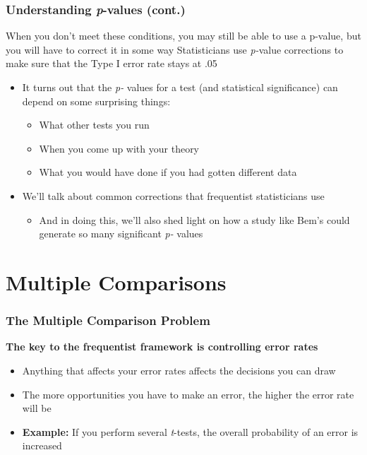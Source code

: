 \documentclass[10pt, block=fill]{beamer}
\begin{document}
\begin{frame}
  \frametitle{Understanding \textit{p}-values (cont.)}
  
  \begin{block}{When you don't meet these conditions, you may still be able to use a p-value, but you will have to correct it in some way}
    Statisticians use \textit{p-}value corrections to make sure that the Type I error rate stays at .05
  \end{block}
  
  \begin{itemize}
    \item  It turns out that the \textit{p-} values for a test (and statistical significance) can depend on some surprising things:
    \begin{itemize}
      \item What other tests you run
      \item When you come up with your theory
      \item What you would have done if you had gotten different data
    \end{itemize}
    \item We'll talk about common corrections that frequentist statisticians use
    \begin{itemize}
      \item And in doing this, we'll also shed light on how a study like Bem's could generate so many significant \textit{p-} values
    \end{itemize}
  \end{itemize}
\end{frame}



\section{Multiple Comparisons}

\begin{frame}
  \frametitle{The Multiple Comparison Problem}

  \textbf{The key to the frequentist framework is controlling error rates}
  
  \vspace{0.25in}
  
  \begin{itemize}
    \item Anything that affects your error rates affects the decisions you can draw
    \item The more opportunities you have to make an error, the higher the error rate will be 
    \item \textbf{Example:} If you perform several \textit{t}-tests, the overall probability of an error is increased
  \end{itemize}
\end{frame}
\end{document}
